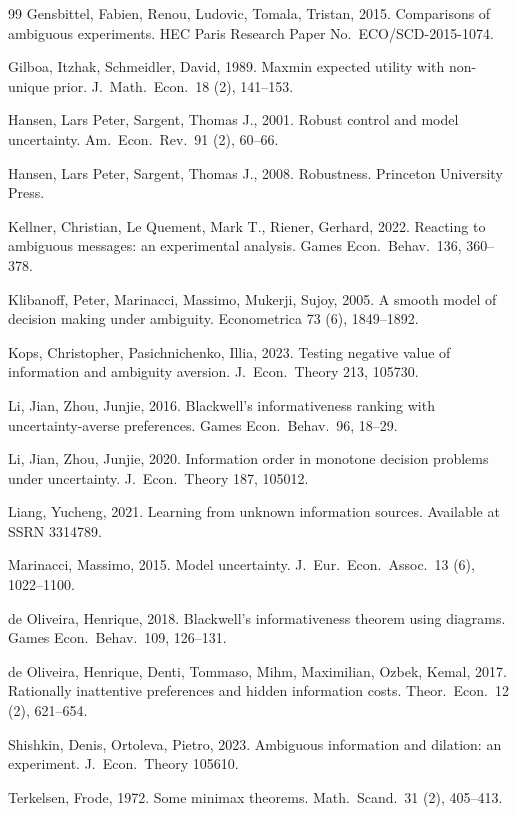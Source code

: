 \documentclass[12pt,a4paper]{article}
\begin{document}
\begin{thebibliography}{99}
Gensbittel, Fabien, Renou, Ludovic, Tomala, Tristan, 2015. Comparisons of ambiguous experiments. HEC Paris Research Paper No.\ ECO/SCD-2015-1074.

Gilboa, Itzhak, Schmeidler, David, 1989. Maxmin expected utility with non-unique prior. J.\ Math.\ Econ.\ 18 (2), 141--153.

Hansen, Lars Peter, Sargent, Thomas J., 2001. Robust control and model uncertainty. Am.\ Econ.\ Rev.\ 91 (2), 60--66.

Hansen, Lars Peter, Sargent, Thomas J., 2008. Robustness. Princeton University Press.

Kellner, Christian, Le Quement, Mark T., Riener, Gerhard, 2022. Reacting to ambiguous messages: an experimental analysis. Games Econ.\ Behav.\ 136, 360--378.

Klibanoff, Peter, Marinacci, Massimo, Mukerji, Sujoy, 2005. A smooth model of decision making under ambiguity. Econometrica 73 (6), 1849--1892.

Kops, Christopher, Pasichnichenko, Illia, 2023. Testing negative value of information and ambiguity aversion. J.\ Econ.\ Theory 213, 105730.

Li, Jian, Zhou, Junjie, 2016. Blackwell's informativeness ranking with uncertainty-averse preferences. Games Econ.\ Behav.\ 96, 18--29.

Li, Jian, Zhou, Junjie, 2020. Information order in monotone decision problems under uncertainty. J.\ Econ.\ Theory 187, 105012.

Liang, Yucheng, 2021. Learning from unknown information sources. Available at SSRN 3314789.

Marinacci, Massimo, 2015. Model uncertainty. J.\ Eur.\ Econ.\ Assoc.\ 13 (6), 1022--1100.

de Oliveira, Henrique, 2018. Blackwell's informativeness theorem using diagrams. Games Econ.\ Behav.\ 109, 126--131.

de Oliveira, Henrique, Denti, Tommaso, Mihm, Maximilian, Ozbek, Kemal, 2017. Rationally inattentive preferences and hidden information costs. Theor.\ Econ.\ 12 (2), 621--654.

Shishkin, Denis, Ortoleva, Pietro, 2023. Ambiguous information and dilation: an experiment. J.\ Econ.\ Theory 105610.

Terkelsen, Frode, 1972. Some minimax theorems. Math.\ Scand.\ 31 (2), 405--413.

\end{thebibliography}
\end{document}
